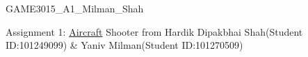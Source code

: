 GAME3015\+\_\+\+A1\+\_\+\+Milman\+\_\+\+Shah

Assignment 1\+: \mbox{\hyperlink{class_aircraft}{Aircraft}} Shooter from Hardik Dipakbhai Shah(\+Student ID\+:101249099) \& Yaniv Milman(\+Student ID\+:101270509) 